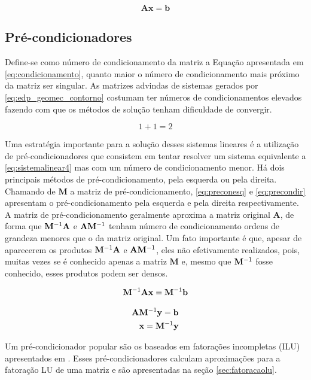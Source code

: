 \begin{equation} \label{eq:sistemalinear4}
    \mathbf{Ax = b}
\end{equation}

\subsection{Pré-condicionadores}

Define-se como número de condicionamento da matriz a Equação apresentada em \eqref{eq:condicionamento}, quanto maior o número de condicionamento mais próximo da matriz ser singular. As matrizes advindas de sistemas gerados por \eqref{eq:edp_geomec_contorno} costumam ter números de condicionamentos elevados fazendo com que os métodos de solução tenham dificuldade de convergir.

\begin{equation} \label{eq:condicionamento}
1+1=2
\end{equation}


Uma estratégia importante para a solução desses sistemas lineares é a utilização de pré-condicionadores que consistem em tentar resolver um sistema equivalente a \eqref{eq:sistemalinear4} mas com um número de condicionamento menor. Há dois principais métodos de pré-condicionamento, pela esquerda ou pela direita. Chamando de $\mathbf{M}$ a matriz de pré-condicionamento, \eqref{eq:preconesq} e \eqref{eq:precondir} apresentam o pré-condicionamento pela esquerda e pela direita respectivamente. A matriz de pré-condicionamento geralmente aproxima a matriz original $\mathbf{A}$, de forma que $\mathbf{M}^{-1} \mathbf{A}$ e $\mathbf{A} \mathbf{M}^{-1}$ tenham número de condicionamento ordens de grandeza menores que o da matriz original. Um fato importante é que, apesar de aparecerem os produtos $\mathbf{M}^{-1} \mathbf{A}$ e $\mathbf{A} \mathbf{M}^{-1}$, eles não efetivamente realizados, pois, muitas vezes se é conhecido apenas a matriz $\mathbf{M}$ e, mesmo que $\mathbf{M}^{-1}$ fosse conhecido, esses produtos podem ser densos.  


\begin{equation} \label{eq:preconesq}
\mathbf{M}^{-1} \mathbf{A} \mathbf{x}= \mathbf{M}^{-1} \mathbf{b}
\end{equation}

\begin{align} \label{eq:precondir}
\mathbf{A} \mathbf{M}^{-1} \mathbf{y} = \mathbf{b} \\
\mathbf{x} = \mathbf{M}^{-1} \mathbf{{y}}
\end{align}


Um pré-condicionador popular são os baseados em fatorações incompletas (ILU) apresentados em \citet{ilupaper}. Esses pré-condicionadores calculam aproximações para a fatoração LU de uma matriz e são apresentadas na seção \ref{sec:fatoracaolu}.

